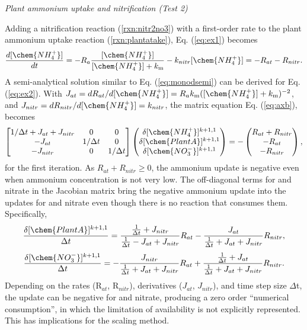\documentclass[gmd, manuscript]{copernicus}
\begin{document}
\noindent \emph{Plant ammonium uptake and nitrification (Test 2)}

Adding a nitrification reaction (\ref{rxn:nitr2no3}) with a first-order rate to
the plant ammonium uptake reaction (\ref{rxn:plantatake}),
Eq. (\ref{eq:ex1}) becomes
\begin{equation}
\frac{d[\chem{NH_4^+}]}{dt} =- R_a
\frac{[\chem{NH_4^+}]}{[\chem{NH_4^+}]+k_\text{m}}
- k_{nitr} [\chem{NH_4^+}] = -R_{at} - R_{nitr}.
\label{eq:ex2}
\end{equation}
A semi-analytical solution similar to Eq. (\ref{eq:monodsemi}) can be derived for Eq. (\ref{eq:ex2}). With $J_{at} =
dR_{at}/d[\chem{NH_4^+}] = R_ak_\text{m}([\chem{NH_4^+}] +
k_\text{m})^{-2}$, and $J_{nitr} = dR_{nitr}/d[\chem{NH_4^+}]=k_{nitr}$,
the matrix
equation Eq. (\ref{eq:axb}), becomes 
\begin{equation}
\left[
\begin{matrix}
1/\Delta t + J_{at} + J_{nitr} & 0 & 0 \\
-J_{at} & 1/\Delta t & 0 \\
-J_{nitr} & 0 & 1/\Delta t \\
\end{matrix}
\right]
\left(
\begin{matrix}
\delta [\chem{NH_4^+}]^{k+1,1} \\
\delta [\chem{PlantA}]^{k+1,1} \\
\delta [\chem{NO_3^-}]^{k+1,1} 
\end{matrix}
\right)
=-
\left(
\begin{matrix}
R_{at} + R_{nitr} \\
-R_{at} \\
-R_{nitr} 
\end{matrix}
\right),
\label{eq:test2}
\end{equation}
for the first iteration. As $R_{at} + R_{nitr} \geq 0$, the ammonium update is
negative even when ammonium concentration is not very low. 
The off-diagonal terms for  and nitrate in the Jacobian matrix
bring the negative ammonium update into the updates for  and
nitrate even though there is no reaction that consumes them. Specifically, 
\begin{equation}
\frac{\delta [\chem{PlantA}]^{k+1,1}}{\Delta t} 
= \frac{\frac{1}{\Delta t} + J_{nitr}}{\frac{1}{\Delta t} - J_{at} + J_{nitr}}
R_{at} - \frac{J_{at} }{\frac{1}{\Delta t} + J_{at} + J_{nitr}} R_{nitr},
\end{equation}
\begin{equation}
\frac{\delta [\chem{NO_3^-}]^{k+1,1}}{\Delta t}
= -\frac{J_{nitr}}{\frac{1}{\Delta t} + J_{at} + J_{nitr}} R_{at} +
\frac{\frac{1}{\Delta t} + J_{at} }{\frac{1}{\Delta t} + J_{at} + J_{nitr}}
R_{nitr}.
\end{equation}
Depending on the rates
(R$_{at}$, R$_{nitr}$), derivatives ($J_{at}$, $J_{nitr}$), and time step size
$\Delta$t, the update can be negative for  and nitrate, producing
a zero order ``numerical consumption'', in which
the limitation of availability is not explicitly
represented. This has implications for the scaling method.
\end{document}
